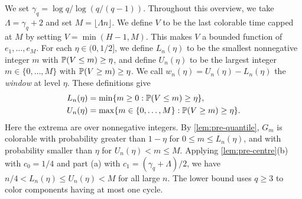 We set $\gamma_q = \log q/\log(q/(q - 1))$. Throughout this overview, we take $\Lambda = \gamma_q + 2$ and set $M = \lfloor\Lambda n\rfloor$. We define $V$ to be the last colorable time capped at $M$ by setting $V = \min(H - 1, M)$. This makes $V$ a bounded function of $e_1, \dots, e_M$. For each $\eta \in (0, 1/2]$, we define $L_n(\eta)$ to be the smallest nonnegative integer $m$ with $\mathbb P(V \le m) \ge \eta$, and define $U_n(\eta)$ to be the largest integer $m \in \{0, \dots, M\}$ with $\mathbb P(V \ge m) \ge \eta$. We call $w_n(\eta) = U_n(\eta) - L_n(\eta)$ the \emph{window} at level $\eta$. These definitions give
\begin{equation}\label{eq:ov-quantiles}
\begin{aligned}
L_n(\eta) &= \min\{m \ge 0 : \mathbb P(V \le m) \ge \eta\}, \\
U_n(\eta) &= \max\{m \in \{0, \dots, M\} : \mathbb P(V \ge m) \ge \eta\}.
\end{aligned}
\end{equation}
Here the extrema are over nonnegative integers. By \cref{lem:pre-quantile}, $G_m$ is colorable with probability greater than $1 - \eta$ for $0 \le m \le L_n(\eta)$, and with probability smaller than $\eta$ for $U_n(\eta) < m \le M$. Applying \cref{lem:pre-centre}(b) with $c_0 = 1/4$ and part (a) with $c_1 = (\gamma_q + \Lambda)/2$, we have $n/4 < L_n(\eta) \le U_n(\eta) < M$ for all large $n$. The lower bound uses $q \ge 3$ to color components having at most one cycle.


